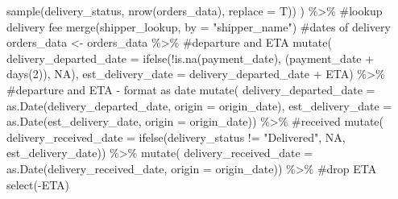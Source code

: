 \documentclass[
  letterpaper,
  DIV=11,
  numbers=noendperiod]{scrartcl}
\newenvironment{Shaded}{\begin{snugshade}}{\end{snugshade}}
\newcommand{\AttributeTok}[1]{\textcolor[rgb]{0.40,0.45,0.13}{#1}}
\newcommand{\CommentTok}[1]{\textcolor[rgb]{0.37,0.37,0.37}{#1}}
\newcommand{\ConstantTok}[1]{\textcolor[rgb]{0.56,0.35,0.01}{#1}}
\newcommand{\DecValTok}[1]{\textcolor[rgb]{0.68,0.00,0.00}{#1}}
\newcommand{\FunctionTok}[1]{\textcolor[rgb]{0.28,0.35,0.67}{#1}}
\newcommand{\NormalTok}[1]{\textcolor[rgb]{0.00,0.23,0.31}{#1}}
\newcommand{\OtherTok}[1]{\textcolor[rgb]{0.00,0.23,0.31}{#1}}
\newcommand{\SpecialCharTok}[1]{\textcolor[rgb]{0.37,0.37,0.37}{#1}}
\newcommand{\StringTok}[1]{\textcolor[rgb]{0.13,0.47,0.30}{#1}}
\begin{document}
\begin{Shaded}
\begin{Highlighting}[numbers=left,,]
             \FunctionTok{sample}\NormalTok{(delivery\_status, }\FunctionTok{nrow}\NormalTok{(orders\_data), }\AttributeTok{replace =}\NormalTok{ T)) ) }\SpecialCharTok{\%\textgreater{}\%}
  \CommentTok{\#lookup delivery fee}
  \FunctionTok{merge}\NormalTok{(shipper\_lookup, }\AttributeTok{by =} \StringTok{"shipper\_name"}\NormalTok{)}
\CommentTok{\#dates of delivery}
\NormalTok{orders\_data }\OtherTok{\textless{}{-}}\NormalTok{ orders\_data }\SpecialCharTok{\%\textgreater{}\%}
  \CommentTok{\#departure and ETA}
  \FunctionTok{mutate}\NormalTok{(}
    \AttributeTok{delivery\_departed\_date =} 
      \FunctionTok{ifelse}\NormalTok{(}\SpecialCharTok{!}\FunctionTok{is.na}\NormalTok{(payment\_date), (payment\_date }\SpecialCharTok{+} \FunctionTok{days}\NormalTok{(}\DecValTok{2}\NormalTok{)), }\ConstantTok{NA}\NormalTok{),}
    \AttributeTok{est\_delivery\_date =}\NormalTok{ delivery\_departed\_date }\SpecialCharTok{+}\NormalTok{ ETA) }\SpecialCharTok{\%\textgreater{}\%}
  \CommentTok{\#departure and ETA {-} format as date}
  \FunctionTok{mutate}\NormalTok{(}
    \AttributeTok{delivery\_departed\_date =} 
      \FunctionTok{as.Date}\NormalTok{(delivery\_departed\_date, }\AttributeTok{origin =}\NormalTok{ origin\_date),}
    \AttributeTok{est\_delivery\_date =} 
      \FunctionTok{as.Date}\NormalTok{(est\_delivery\_date, }\AttributeTok{origin =}\NormalTok{ origin\_date)) }\SpecialCharTok{\%\textgreater{}\%}
  \CommentTok{\#received}
  \FunctionTok{mutate}\NormalTok{(}
    \AttributeTok{delivery\_received\_date =} 
      \FunctionTok{ifelse}\NormalTok{(delivery\_status }\SpecialCharTok{!=} \StringTok{"Delivered"}\NormalTok{, }\ConstantTok{NA}\NormalTok{, est\_delivery\_date)) }\SpecialCharTok{\%\textgreater{}\%}
  \FunctionTok{mutate}\NormalTok{(}
    \AttributeTok{delivery\_received\_date =} 
      \FunctionTok{as.Date}\NormalTok{(delivery\_received\_date, }\AttributeTok{origin =}\NormalTok{ origin\_date)) }\SpecialCharTok{\%\textgreater{}\%}
  \CommentTok{\#drop ETA}
  \FunctionTok{select}\NormalTok{(}\SpecialCharTok{{-}}\NormalTok{ETA)}


\end{Highlighting}
\end{Shaded}
\end{document}
